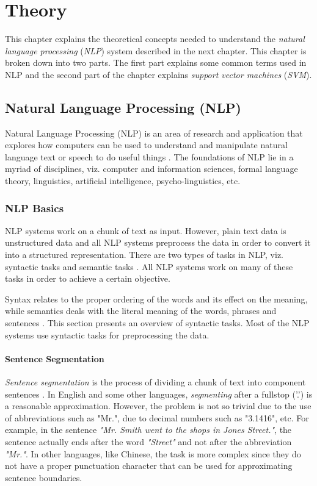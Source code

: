 \chapter{Theory}\label{chapter:theory}

This chapter explains the theoretical concepts needed to understand the \textit{natural language processing} (\textit{NLP}) system described in the next chapter. This chapter is broken down into two parts. The first part explains some common terms used in NLP and the second part of the chapter explains \textit{support vector machines} (\textit{SVM}).

\section{Natural Language Processing (NLP)}

Natural Language Processing (NLP) is an area of research and application that explores how computers can be used to understand and manipulate natural language text or speech to do useful things \cite{chowdhury2003natural}. The foundations of NLP lie in a myriad of disciplines, viz. computer and information sciences, formal language theory, linguistics, artificial intelligence, psycho-linguistics, etc.

\subsection{NLP Basics}\label{sec:NLPPipeline}

NLP systems work on a chunk of text as input. However, plain text data is unstructured data and all NLP systems preprocess the data in order to convert it into a structured representation. There are two types of tasks in NLP, viz. syntactic tasks and semantic tasks \cite{nlpcourse}. All NLP systems work on many of these tasks in order to achieve a certain objective.

Syntax relates to the proper ordering of the words and its effect on the meaning, while semantics deals with the literal meaning of the words, phrases and sentences \cite{wiki:sentSeg}. This section presents an overview of syntactic tasks. Most of the NLP systems use syntactic tasks for preprocessing the data.

\subsubsection{Sentence Segmentation}

\textit{Sentence segmentation} is the process of dividing a chunk of text into component sentences \cite{wiki:sentSeg}. In English and some other languages, \emph{segmenting} after a fullstop ('.') is a reasonable approximation. However, the problem is not so trivial due to the use of abbreviations such as "Mr.", due to decimal numbers such as "3.1416", etc. For example, in the sentence \textit{"Mr. Smith went to the shops in Jones Street."}, the sentence actually ends after the word \textit{"Street"} and not after the abbreviation \textit{"Mr."}. In other languages, like Chinese, the task is more complex since they do not have a proper punctuation character that can be used for approximating sentence boundaries.

